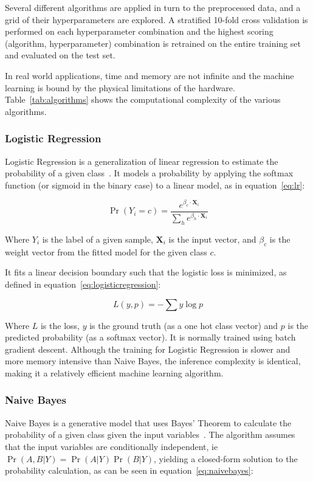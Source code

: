\documentclass[landscape,twocolumn]{article}
\begin{document}
Several different algorithms are applied in turn to the preprocessed data, and a grid of their hyperparameters are explored. A stratified 10-fold cross validation is performed on each hyperparameter combination and the highest scoring (algorithm, hyperparameter) combination is retrained on the entire training set and evaluated on the test set.

In real world applications, time and memory are not infinite and the machine learning is bound by the physical limitations of the hardware. Table~\ref{tab:algorithms} shows the computational complexity of the various algorithms.

\subsubsection{Logistic Regression}
Logistic Regression is a generalization of linear regression to estimate the probability of a given class~\cite{wright1995logistic}. It models a probability by applying the softmax function (or sigmoid in the binary case) to a linear model, as in equation~\ref{eq:lr}:

\begin{equation}
	\label{eq:lr}
	\Pr\left(Y_i=c\right)=\frac{e^{\beta_c \cdot \textbf{X}_i}}{\sum_h{e^{\beta_h \cdot \textbf{X}_i}}}
\end{equation}

Where $Y_i$ is the label of a given sample, $\textbf{X}_i$ is the input vector, and $\beta_c$ is the weight vector from the fitted model for the given class $c$.

It fits a linear decision boundary such that the logistic loss is minimized, as defined in equation~\ref{eq:logisticregression}:

\begin{equation}
	\label{eq:logisticregression}
	L\left(y,p\right)=-\sum{y\log{p}}
\end{equation}

Where $L$ is the loss, $y$ is the ground truth (as a one hot class vector) and $p$ is the predicted probability (as a softmax vector). It is normally trained using batch gradient descent. Although the training for Logistic Regression is slower and more memory intensive than Naive Bayes, the inference complexity is identical, making it a relatively efficient machine learning algorithm.


\subsubsection{Naive Bayes}
Naive Bayes is a generative model that uses Bayes' Theorem to calculate the probability of a given class given the input variables~\cite{rish2001empirical}. The algorithm assumes that the input variables are conditionally independent, ie $\Pr\left(A,B|Y\right)=\Pr\left(A|Y\right)\Pr\left(B|Y\right)$, yielding a closed-form solution to the probability calculation, as can be seen in equation~\ref{eq:naivebayes}:
\end{document}
